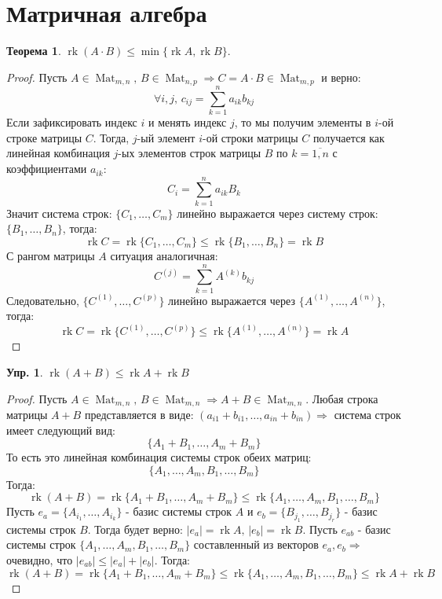 \documentclass[12pt]{article}
\newcommand{\RN}[1]{%
	\textup{\uppercase\expandafter{\romannumeral#1}}%
}
\theoremstyle{definition}
\newtheorem{exrc}{Упр.}
\newtheorem{theorem}{Теорема}
\DeclareMathOperator{\rk}{\text{rk}}
\newcommand{\ddsum}[2]{\displaystyle\sum\limits_{#1}^{#2}}
\newcommand{\mat}[2]{\operatorname{Mat}_{#1, #2}}
\begin{document}
\lhead{Алгебра-\RN{1}}
\section*{Матричная алгебра}
\begin{theorem}
	$\rk{(A\cdot B)} \leq \min\{\rk{A},\rk{B}\}$.
\end{theorem}
\begin{proof}
	Пусть $A \in \mat{m}{n}, \, B \in \mat{n}{p} \Rightarrow C = A{\cdot}B \in \mat{m}{p}$ и верно: $$
		\forall i,j, \, c_{ij} = \ddsum{k = 1}{n}a_{ik}b_{kj}
	$$ 
	Если зафиксировать индекс $i$ и менять индекс $j$, то мы получим элементы в $i$-ой строке матрицы $C$. Тогда, $j$-ый элемент $i$-ой строки матрицы $C$ получается как линейная комбинация $j$-ых элементов строк матрицы $B$ по $k =\overline{1,n}$ с коэффициентами $a_{ik}$: 
	$$
		C_i = \ddsum{k = 1}{n}a_{ik}B_k
	$$ 
	Значит система строк: $\{C_1,\dotsc, C_m\}$ линейно выражается через систему строк: $\{B_1 , \dotsc, B_n \}$, тогда: 
	$$
		\rk{C} = \rk\{C_1,\dotsc, C_m\} \leq \rk\{B_1,\dotsc,B_n\} = \rk{B}
	$$ 
	С рангом матрицы $A$ ситуация аналогичная: 
	$$
		C^{(j)} = \ddsum{k = 1}{n}A^{(k)}b_{kj}
	$$ 
	Следовательно, $\{C^{(1)}, \dotsc, C^{(p)}\}$ линейно выражается через $\{A^{(1)},\dotsc,  A^{(n)}\}$, тогда:
	$$
		\rk{C} = \rk\{C^{(1)},\dotsc, C^{(p)}\} \leq \rk\{A^{(1)}, \dots, A^{(n)}\} = \rk{A}
	$$
\end{proof}

\begin{exrc}
	$\rk{(A+B)}  \leq \rk{A} + \rk{B}$
\end{exrc}
\begin{proof}
	Пусть $A \in \mat{m}{n}, \, B \in \mat{m}{n} \Rightarrow A + B \in \mat{m}{n}$. Любая строка матрицы $A + B$ представляется в виде: $(a_{i1} + b_{i1}, \dotsc, a_{in} + b_{in}) \Rightarrow$ система строк имеет следующий вид: 
	$$
		\{A_1 + B_1, \dotsc, A_m + B_m\}
	$$
	То есть это линейная комбинация системы строк обеих матриц: 
	$$
		\{A_1, \dotsc, A_m, B_1, \dotsc,B_m\}
	$$ 
	Тогда: 
	$$
		 \rk{(A+B)} = \rk{\{A_1 + B_1, \dotsc, A_m + B_m\}} \leq \rk{\{A_1, \dotsc, A_m, B_1, \dotsc,B_m\}}
	$$
	Пусть $e_a = \{A_{i_1}, \dotsc, A_{i_k}\}$ - базис системы строк $A$ и $e_b = \{B_{j_1}, \dotsc, B_{j_r}\}$ - базис системы строк $B$. Тогда будет верно: $|e_a| = \rk{A}, \, |e_b| = \rk{B}$. Пусть $e_{ab}$ - базис системы строк $\{A_1, \dotsc, A_m, B_1, \dotsc, B_m\}$ составленный из векторов $e_a, e_b \Rightarrow$ очевидно, что $|e_{ab}| \leq |e_a| + |e_b|$. Тогда:
	$$
		 \rk{(A+B)} = \rk{\{A_1 + B_1, \dotsc, A_m + B_m\}} \leq \rk{\{A_1, \dotsc, A_m, B_1, \dotsc,B_m\}} \leq \rk{A} + \rk{B}
	$$
\end{proof}
\end{document}
